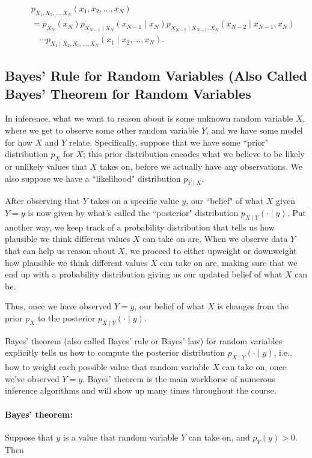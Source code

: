 \documentclass[6008notes.tex]{subfiles}
\begin{document}
\begin{eqnarray*}
&& p_{X_1, X_2, \dots ,X_N}(x_1, x_2, \dots, x_N) \\
&&=
  p_{X_N}(x_N)
  p_{X_{N-1} \mid X_N}(x_{N-1} \mid x_N)
  p_{X_{N-2} \mid X_{N-1}, X_N}(x_{N-2} \mid x_{N-1}, x_N) \\
&&\quad
  \cdots
  p_{X_1 \mid X_2, X_3, \dots, X_N}(x_1 \mid x_2, \dots, x_N).
\end{eqnarray*}

\subsection{Bayes' Rule for Random Variables (Also Called Bayes' Theorem for Random Variables}

In inference, what we want to reason about is some unknown random variable $X$, where we get to observe some other random variable $Y$, and we have some model for how $X$ and $Y$ relate. Specifically, suppose that we have some “prior" distribution $p_X$ for $X$; this prior distribution encodes what we believe to be likely or unlikely values that $X$ takes on, before we actually have any observations. We also suppose we have a “likelihood" distribution $p_{Y\mid X}$.

After observing that $Y$ takes on a specific value $y$, our “belief" of what $X$ given $Y=y$ is now given by what's called the “posterior" distribution $p_{X\mid Y}(\cdot \mid y)$. Put another way, we keep track of a probability distribution that tells us how plausible we think different values $X$ can take on are. When we observe data $Y$ that can help us reason about $X$, we proceed to either upweight or downweight how plausible we think different values $X$ can take on are, making sure that we end up with a probability distribution giving us our updated belief of what $X$ can be.

Thus, once we have observed $Y=y$, our belief of what $X$ is changes from the prior $p_X$ to the posterior $p_{X\mid Y}(\cdot \mid y)$.

Bayes' theorem (also called Bayes' rule or Bayes' law) for random variables explicitly tells us how to compute the posterior distribution $p_{X\mid Y}(\cdot \mid y)$, i.e., how to weight each possible value that random variable $X$ can take on, once we've observed $Y=y$. Bayes' theorem is the main workhorse of numerous inference algorithms and will show up many times throughout the course.

\paragraph{Bayes' theorem:} Suppose that $y$ is a value that random variable $Y$ can take on, and $p_{Y}(y)>0$. Then
\end{document}
